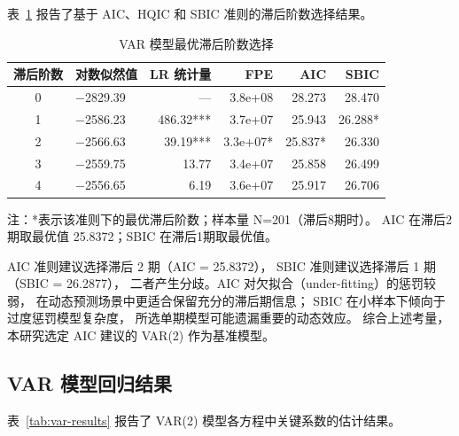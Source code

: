 \documentclass[
    type = master, %
    degree = professional,        %
    decl-page,  %
    twoside,                %
    fontset = fandol %
  ]{njuthesis}
\begin{document}
表~\ref{tab:lag-selection} 报告了基于 AIC、HQIC 和 SBIC 准则的滞后阶数选择结果。

\begin{table}[htbp]
    \centering
    \caption{VAR 模型最优滞后阶数选择}
    \label{tab:lag-selection}
    \begin{tabularx}{\textwidth}{cXrrrr}
        \toprule
        滞后阶数 & 对数似然值 & LR 统计量 & FPE & AIC & SBIC \\
        \midrule
        0 & $-$2829.39 & --- & 3.8e+08 & 28.273 & 28.470 \\
        1 & $-$2586.23 & 486.32*** & 3.7e+07 & 25.943 & 26.288* \\
        2 & $-$2566.63 & 39.19*** & 3.3e+07* & 25.837* & 26.330 \\
        3 & $-$2559.75 & 13.77 & 3.4e+07 & 25.858 & 26.499 \\
        4 & $-$2556.65 & 6.19 & 3.6e+07 & 25.917 & 26.706 \\
        \bottomrule
    \end{tabularx}
    \begin{minipage}{\textwidth}
        \vspace{0.3em}
        \footnotesize 注：*表示该准则下的最优滞后阶数；样本量 N=201（滞后8期时）。
              AIC 在滞后2期取最优值 25.8372；SBIC 在滞后1期取最优值。
    \end{minipage}
\end{table}

AIC 准则建议选择滞后 2 期（AIC = 25.8372），
SBIC 准则建议选择滞后 1 期（SBIC = 26.2877），
二者产生分歧。AIC 对欠拟合（under-fitting）的惩罚较弱，
在动态预测场景中更适合保留充分的滞后期信息；
SBIC 在小样本下倾向于过度惩罚模型复杂度，
所选单期模型可能遗漏重要的动态效应。
综合上述考量，本研究选定 AIC 建议的 VAR(2) 作为基准模型。

\subsection{VAR 模型回归结果}

表~\ref{tab:var-results} 报告了 VAR(2) 模型各方程中关键系数的估计结果。
\end{document}
